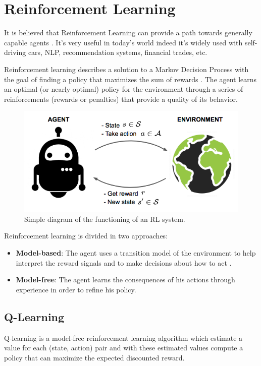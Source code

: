 \section{Reinforcement Learning}
It is believed that Reinforcement Learning can provide a path towards generally capable agents \cite{silver2021reward} \cite{parker2022automated}.
It's very useful in today's world indeed it's widely used with self-driving cars, NLP, recommendation systems, financial trades, etc.

Reinforcement learning \cite{sutton2018reinforcement} describes a solution to a Markov Decision Process 
with the goal of finding a policy that maximizes the sum of rewards \cite{huys2014reward}.
%
The agent learns an optimal (or nearly optimal) policy for the environment \cite{russell2002artificial}
through a series of reinforcements (rewards or penalties) that provide a quality of its behavior.

\begin{figure}[ht]
    \centering
    \includegraphics[scale=0.4]{images/RL_illustration.png}
    \caption{Simple diagram of the functioning of an RL system.}
    \label{fig:RL_illustration}
\end{figure}

\newpage
\noindent
Reinforcement learning is divided in two approaches:
\begin{itemize}
    \item \textbf{Model-based}:
    The agent uses a transition model of the environment to help interpret the reward signals and to make decisions about how to act \cite{russell2021artificial}.    
    \item \textbf{Model-free}:
    The agent learns the consequences of his actions through experience in order to refine his policy.
\end{itemize}


\subsection{Q-Learning}
Q-learning \cite{watkins1992q} is a model-free reinforcement learning algorithm which estimate a value for each (state, action) pair
and with these estimated values compute a policy that can maximize the expected discounted reward.

